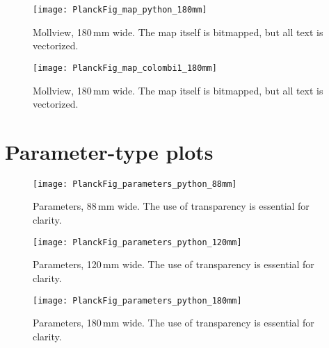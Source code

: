 \documentclass[traditabstract]{aa}
\begin{document}
\begin{figure*}[H!b]
\texttt{[image: PlanckFig\_map\_python\_180mm]}
\caption{\label{fig:gainCurve} Mollview, 180\,mm wide.  The map itself is bitmapped, but all text is vectorized.}
\end{figure*}

\begin{figure*}[H!b]
\texttt{[image: PlanckFig\_map\_colombi1\_180mm]}
\caption{\label{fig:gainCurve} Mollview, 180\,mm wide.  The map itself is bitmapped, but all text is vectorized.}
\end{figure*}


\clearpage








\section{Parameter-type plots}


\begin{figure}[h]
\texttt{[image: PlanckFig\_parameters\_python\_88mm]}
\caption{\label{fig:gainCurve}Parameters, 88\,mm wide.  The use of transparency is essential for clarity.}
\end{figure}

\begin{figure*}[H!b]
\sidecaption
\texttt{[image: PlanckFig\_parameters\_python\_120mm]}
\caption{\label{fig:gainCurve}Parameters, 120\,mm wide.  The use of transparency is essential for clarity.}
\end{figure*}

\begin{figure*}[H!b]
\texttt{[image: PlanckFig\_parameters\_python\_180mm]}
\caption{\label{fig:gainCurve}Parameters, 180\,mm wide.  The use of transparency is essential for clarity.}
\end{figure*}
\end{document}
